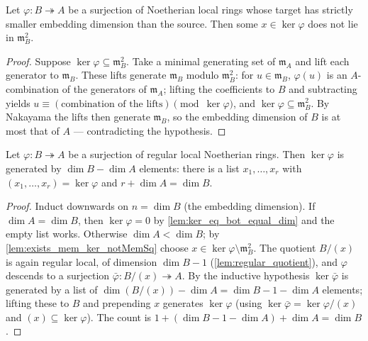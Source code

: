 \begin{lemma}
  \label{lem:exists_mem_ker_notMemSq}
  \leanok
  Let \(\varphi : B \twoheadrightarrow A\) be a surjection of Noetherian local
  rings whose target has strictly smaller embedding dimension than the source.
  Then some \(x \in \ker\varphi\) does not lie in \(\mathfrak m_B^2\).
\end{lemma}
\begin{proof}
  \leanok
  Suppose \(\ker\varphi \subseteq \mathfrak m_B^2\). Take a minimal generating
  set of \(\mathfrak m_A\) and lift each generator to \(\mathfrak m_B\). These
  lifts generate \(\mathfrak m_B\) modulo \(\mathfrak m_B^2\): for
  \(u \in \mathfrak m_B\), \(\varphi(u)\) is an \(A\)-combination of the
  generators of \(\mathfrak m_A\); lifting the coefficients to \(B\) and
  subtracting yields \(u \equiv (\text{combination of the lifts}) \pmod{\ker\varphi}\),
  and \(\ker\varphi \subseteq \mathfrak m_B^2\). By Nakayama the lifts then
  generate \(\mathfrak m_B\), so the embedding dimension of \(B\) is at most that
  of \(A\) --- contradicting the hypothesis.
\end{proof}

\begin{theorem}
  \label{thm:ker_gen_regular_local}
  \leanok
  Let \(\varphi : B \twoheadrightarrow A\) be a surjection of regular local
  Noetherian rings. Then \(\ker\varphi\) is generated by \(\dim B - \dim A\)
  elements: there is a list \(x_1, \dots, x_r\) with \((x_1, \dots, x_r) =
  \ker\varphi\) and \(r + \dim A = \dim B\).
\end{theorem}
\begin{proof}
  \leanok
  Induct downwards on \(n = \dim B\) (the embedding dimension). If
  \(\dim A = \dim B\), then \(\ker\varphi = 0\) by \ref{lem:ker_eq_bot_equal_dim}
  and the empty list works. Otherwise \(\dim A < \dim B\); by
  \ref{lem:exists_mem_ker_notMemSq} choose \(x \in \ker\varphi \setminus
  \mathfrak m_B^2\). The quotient \(B/(x)\) is again regular local, of dimension
  \(\dim B - 1\) (\ref{lem:regular_quotient}), and \(\varphi\) descends to a
  surjection \(\bar\varphi : B/(x) \twoheadrightarrow A\). By the inductive
  hypothesis \(\ker\bar\varphi\) is generated by a list of
  \(\dim(B/(x)) - \dim A = \dim B - 1 - \dim A\) elements; lifting these to \(B\)
  and prepending \(x\) generates \(\ker\varphi\) (using
  \(\ker\bar\varphi = \ker\varphi/(x)\) and \((x) \subseteq \ker\varphi\)). The
  count is \(1 + (\dim B - 1 - \dim A) + \dim A = \dim B\).
\end{proof}

